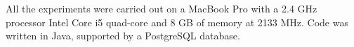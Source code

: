 All the experiments were carried out on a MacBook Pro %
with a 2.4 GHz processor Intel Core i5 quad-core and 8 GB of memory at 2133 MHz.  Code was written in Java, supported by a PostgreSQL database. 


%
%
%
% 
